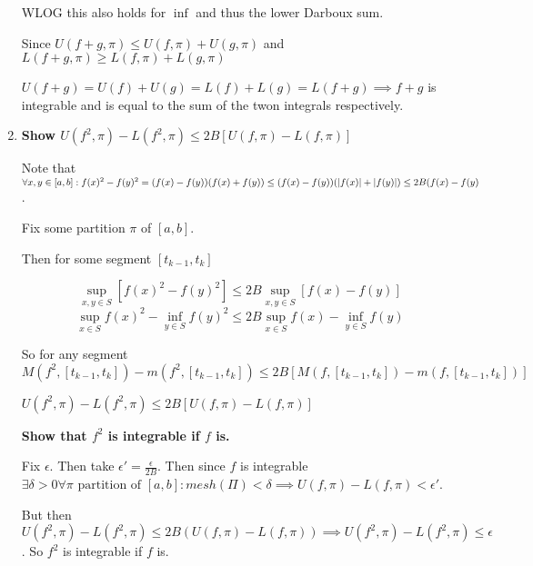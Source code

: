 \documentclass[10pt,a4paper]{article}
\DeclarePairedDelimiter{\abs}{\lvert}{\rvert}
\begin{document}
\begin{enumerate}
        WLOG this also holds for $\inf$ and thus the lower Darboux sum. 

        Since $U(f+g, \pi) \leq U(f, \pi) + U(g, \pi)$ and $L(f+g, \pi) \geq L(f, \pi) + L(g, \pi)$ 

        $U(f+g) = U(f) + U(g)  = L(f) + L(g) = L(f+g) \implies f+g$  is integrable and is equal to the sum of the twon integrals respectively.


    \item \textbf{Show $U(f^2, \pi) -L(f^2, \pi) \leq 2B[U(f, \pi) - L(f, \pi)]$}

        Note that $\forall x,y \in [a,b]: f(x)^2 - f(y)^2 = (f(x) -f(y))(f(x) + f(y)) \leq (f(x) -f(y))(\abs{f(x)} + \abs{f(y)}) \leq 2B(f(x) - f(y)$. 

        Fix some partition $\pi$ of $[a,b]$.

        Then for some segment $[t_{k-1}, t_k]$  

        $$\sup_{x,y \in S} [f(x)^2 -f(y)^2] \leq 2B \sup_{x, y \in S} [f(x) - f(y)]$$
        $$\sup_{x \in S} f(x)^2 - \inf_{y \in S}  f(y)^2 \leq 2B \sup_{x \in S} f(x) - \inf_{y \in S} f(y)$$

        So for any segment $M(f^2, [t_{k-1}, t_k])- m(f^2, [t_{k-1}, t_k] ) \leq 2B [M(f, [t_{k-1}, t_k]) - m (f, [t_{k-1}, t_k])]$
        
        $U(f^2, \pi) - L(f^2, \pi) \leq 2B [U(f, \pi) - L(f,\pi)]$

        \textbf{Show that $f^2$ is integrable if $f$ is.}


        Fix $\epsilon$. Then take $\epsilon' = \frac{\epsilon}{2B}$. Then since $f$ is integrable $\exists \delta > 0 \forall \pi \text{ partition of } [a,b] : mesh(\Pi) < \delta \implies U(f, \pi) - L(f, \pi) < \epsilon'$.

        But then $U(f^2, \pi) - L(f^2, \pi) \leq 2B(U(f, \pi) - L(f, \pi) ) \implies U(f^2, \pi) - L(f^2, \pi) \leq \epsilon$. So $f^2$ is integrable if $f$ is.


\end{enumerate}
\end{document}
